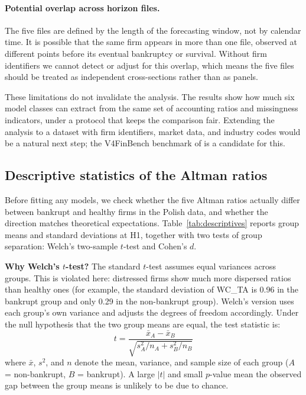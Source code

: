 \documentclass[12pt,a4paper]{article}
\begin{document}
\paragraph{Potential overlap across horizon files.} The five files are defined
by the length of the forecasting window, not by calendar time. It is possible
that the same firm appears in more than one file, observed at different points
before its eventual bankruptcy or survival. Without firm identifiers we cannot
detect or adjust for this overlap, which means the five files should be treated
as independent cross-sections rather than as panels.

These limitations do not invalidate the analysis. The results show how much
six model classes can extract from the same set of accounting ratios and
missingness indicators, under a protocol that keeps the comparison fair. Extending
the analysis to a dataset with firm identifiers, market data, and industry
codes would be a natural next step; the V4FinBench benchmark of
\cite{kostrzewa2025} is a candidate for this.

\subsection{Descriptive statistics of the Altman ratios}
\label{sec:descriptives}

Before fitting any models, we check whether the five Altman ratios actually
differ between bankrupt and healthy firms in the Polish data, and whether the
direction matches theoretical expectations. Table~\ref{tab:descriptives}
reports group means and standard deviations at H1, together with two tests
of group separation: Welch's two-sample $t$-test and Cohen's $d$.

\textbf{Why Welch's $t$-test?} The standard $t$-test assumes equal
variances across groups. This is violated here: distressed firms show
much more dispersed ratios than healthy ones (for example, the standard
deviation of WC\_TA is 0.96 in the bankrupt group and only 0.29 in the
non-bankrupt group). Welch's version \citep{welch1947} uses each group's
own variance and adjusts the degrees of freedom accordingly. Under the null hypothesis that the two
group means are equal, the test statistic is:
\begin{equation}
t = \frac{\bar{x}_A - \bar{x}_B}{\sqrt{s_A^2/n_A + s_B^2/n_B}}
\label{eq:welch}
\end{equation}
where $\bar{x}$, $s^2$, and $n$ denote the mean, variance, and sample size
of each group ($A$ = non-bankrupt, $B$ = bankrupt). A large $|t|$ and small
$p$-value mean the observed gap between the group means is unlikely to be
due to chance.
\end{document}
